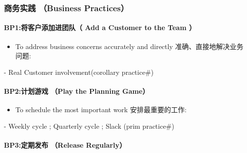 \hypertarget{ux5546ux52a1ux5b9eux8df5-business-practices}{%
\subsubsection{商务实践 （Business
Practices）}\label{ux5546ux52a1ux5b9eux8df5-business-practices}}

\hypertarget{bp1ux5c06ux5ba2ux6237ux6dfbux52a0ux8fdbux56e2ux961f-add-a-customer-to-the-team}{%
\paragraph{BP1:将客户添加进团队（ Add a Customer to the Team
）}\label{bp1ux5c06ux5ba2ux6237ux6dfbux52a0ux8fdbux56e2ux961f-add-a-customer-to-the-team}}

\begin{itemize}
\tightlist
\item
  To address business concerns accurately and directly
  准确、直接地解决业务问题:
\end{itemize}

\begin{description}
\tightlist
\item[]
- Real Customer involvement(corollary practice\#)
\end{description}

\hypertarget{bp2ux8ba1ux5212ux6e38ux620f-play-the-planning-game}{%
\paragraph{BP2:计划游戏 （Play the Planning
Game）}\label{bp2ux8ba1ux5212ux6e38ux620f-play-the-planning-game}}

\begin{itemize}
\tightlist
\item
  To schedule the most important work 安排最重要的工作:\\
\end{itemize}

\begin{description}
\tightlist
\item[]
- Weekly cycle ; Quarterly cycle ; Slack (prim practice\#)
\end{description}

\hypertarget{bp3ux5b9aux671fux53d1ux5e03-release-regularly}{%
\paragraph{BP3:定期发布 （Release
Regularly）}\label{bp3ux5b9aux671fux53d1ux5e03-release-regularly}}

